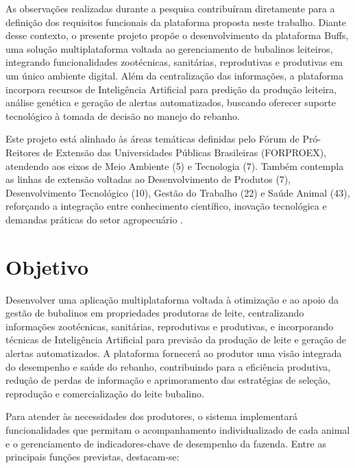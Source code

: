 \documentclass[11pt,a4paper]{article}
\begin{document}
As observações realizadas durante a pesquisa contribuíram diretamente para a definição dos requisitos funcionais da plataforma proposta neste trabalho. Diante desse contexto, o presente projeto propõe o desenvolvimento da plataforma Buffs, uma solução multiplataforma voltada ao gerenciamento de bubalinos leiteiros, integrando funcionalidades zootécnicas, sanitárias, reprodutivas e produtivas em um único ambiente digital. Além da centralização das informações, a plataforma incorpora recursos de Inteligência Artificial para predição da produção leiteira, análise genética e geração de alertas automatizados, buscando oferecer suporte tecnológico à tomada de decisão no manejo do rebanho.

Este projeto está alinhado às áreas temáticas definidas pelo Fórum de Pró-Reitores de Extensão das Universidades Públicas Brasileiras (FORPROEX), atendendo aos eixos de Meio Ambiente (5) e Tecnologia (7). Também contempla as linhas de extensão voltadas ao Desenvolvimento de Produtos (7), Desenvolvimento Tecnológico (10), Gestão do Trabalho (22) e Saúde Animal (43), reforçando a integração entre conhecimento científico, inovação tecnológica e demandas práticas do setor agropecuário \cite{FORPROEX}.


\section{Objetivo}

Desenvolver uma aplicação multiplataforma voltada à otimização e ao apoio da gestão de bubalinos em propriedades produtoras de leite, centralizando informações zootécnicas, sanitárias, reprodutivas e produtivas, e incorporando técnicas de Inteligência Artificial para previsão da produção de leite e geração de alertas automatizados. A plataforma fornecerá ao produtor uma visão integrada do desempenho e saúde do rebanho, contribuindo para a eficiência produtiva, redução de perdas de informação e aprimoramento das estratégias de seleção, reprodução e comercialização do leite bubalino.

Para atender às necessidades dos produtores, o sistema implementará funcionalidades que permitam o acompanhamento individualizado de cada animal e o gerenciamento de indicadores-chave de desempenho da fazenda. Entre as principais funções previstas, destacam-se:
\end{document}
